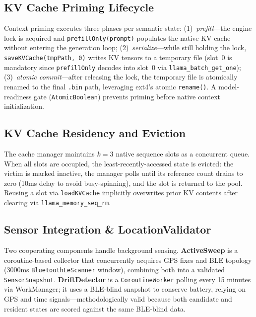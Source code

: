 \documentclass[journal]{IEEEtran}
\begin{document}
\subsection{KV Cache Priming Lifecycle}
\label{sec:priming}

Context priming executes three phases per semantic state: (1)~\emph{prefill}---the engine lock is acquired and \texttt{prefillOnly(prompt)} populates the native KV cache without entering the generation loop; (2)~\emph{serialize}---while still holding the lock, \texttt{saveKVCache(tmpPath, 0)} writes KV tensors to a temporary file (slot~0 is mandatory since \texttt{prefillOnly} decodes into slot~0 via \texttt{llama\_batch\_get\_one}); (3)~\emph{atomic commit}---after releasing the lock, the temporary file is atomically renamed to the final \texttt{.bin} path, leveraging ext4's atomic \texttt{rename()}. A model-readiness gate (\texttt{AtomicBoolean}) prevents priming before native context initialization.

\subsection{KV Cache Residency and Eviction}
\label{sec:eviction}

The cache manager maintains $k = 3$ native sequence slots as a concurrent queue. When all slots are occupied, the least-recently-accessed state is evicted: the victim is marked inactive, the manager polls until its reference count drains to zero (10ms delay to avoid busy-spinning), and the slot is returned to the pool. Reusing a slot via \texttt{loadKVCache} implicitly overwrites prior KV contents after clearing via \texttt{llama\_memory\_seq\_rm}.

\subsection{Sensor Integration \& LocationValidator}
\label{sec:sensors}

Two cooperating components handle background sensing. \textbf{ActiveSweep} is a coroutine-based collector that concurrently acquires GPS fixes and BLE topology (3000ms \texttt{BluetoothLeScanner} window), combining both into a validated \texttt{SensorSnapshot}. \textbf{DriftDetector} is a \texttt{CoroutineWorker} polling every 15 minutes via WorkManager; it uses a BLE-blind snapshot to conserve battery, relying on GPS and time signals---methodologically valid because both candidate and resident states are scored against the same BLE-blind data.
\end{document}
